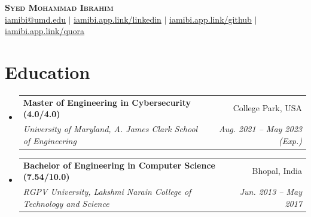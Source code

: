 \documentclass[letterpaper,11pt]{article}
\makeatletter
\newcommand{\resumeItem}[1]{
  \item\small{
    {#1 \vspace{-2pt}}
  }
}
\newcommand{\resumeSubheading}[4]{
  \vspace{-2pt}\item
    \begin{tabular*}{0.97\textwidth}[t]{l@{\extracolsep{\fill}}r}
      \textbf{#1} & #2 \\
      \textit{\small#3} & \textit{\small #4} \\
    \end{tabular*}\vspace{-7pt}
}
\newcommand{\resumeSubHeadingListStart}{\begin{itemize}[leftmargin=0.15in, label={}]}
\newcommand{\resumeSubHeadingListEnd}{\end{itemize}}
\newcommand{\resumeItemListStart}{\begin{itemize}}
\newcommand{\resumeItemListEnd}{\end{itemize}\vspace{-5pt}}
\makeatother
\begin{document}

\begin{center}
    \textbf{\Huge \scshape Syed Mohammad Ibrahim} \\ \vspace{1pt}
    \href{mailto:iamibi@umd.edu}{iamibi@umd.edu} $|$
    \href{https://iamibi.app.link/linkedin}{iamibi.app.link/linkedin} $|$
    \href{https://iamibi.app.link/github}{iamibi.app.link/github} $|$
    \href{https://iamibi.app.link/quora}{iamibi.app.link/quora}
\end{center}

\section{Education}
  \resumeSubHeadingListStart
    \resumeSubheading
      {Master of Engineering in Cybersecurity (4.0/4.0)}{College Park, USA}
      {University of Maryland, A. James Clark School of Engineering}{Aug. 2021 -- May 2023 (Exp.)}
    \resumeSubheading
      {Bachelor of Engineering in Computer Science (7.54/10.0)}{Bhopal, India}
      {RGPV University, Lakshmi Narain College of Technology and Science}{Jun. 2013 -- May 2017}
  \resumeSubHeadingListEnd

\end{document}
